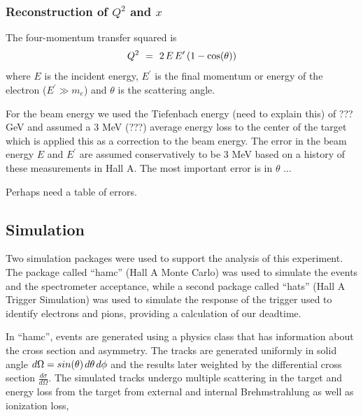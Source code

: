 
\subsubsection{Reconstruction of $Q^2$ and $x$}\label{sec:ana_q2}

The four-momentum transfer squared is 
\begin{equation} \label{eq:qsq}
Q^2 \hskip 0.05in
= \hskip 0.05in 2 \hskip 0.02in E \hskip 0.02in 
E^{\prime} \hskip 0.02in (1- {\rm cos}(\theta))
\end{equation}
where $E$ is the incident energy, $E^{\prime}$ is the
final momentum or energy of the 
electron ($E^{\prime} \gg m_e$) and
$\theta$ is the scattering angle.  

For the beam energy we used the Tiefenbach energy (need to 
explain this) of ??? GeV
and assumed a 3 MeV (???) average energy loss to the center of the 
target which is applied
this as a correction to the beam energy.  
The error in the beam energy $E$ and $E^{\prime}$ are assumed
conservatively to be 3 MeV based on a history of these measurements
in Hall A.  The most important error is in $\theta$ ...

Perhaps need a table of errors.


\subsection{Simulation}

Two simulation packages were used to support the analysis of this experiment.
The package called ``hamc'' (Hall A Monte Carlo) was used to simulate
the events and the spectrometer acceptance, while a second package
called ``hats'' (Hall A Trigger Simulation) was used to simulate the
response of the trigger used to identify electrons and pions, providing
a calculation of our deadtime.

In ``hamc'', events are generated using a physics class that has information about the cross section and asymmetry.  
The tracks are generated uniformly in solid angle 
\hskip 0.05in $d\Omega = sin(\theta) \hskip 0.02in d\theta \hskip 0.02in d\phi$ \hskip 0.05in and 
the results later weighted by the differential cross section $\frac{d\sigma}{d\Omega}$. 
The simulated tracks undergo multiple scattering in the target and 
energy loss from the target from external and internal Brehmstrahlung as 
well as ionization loss, 

